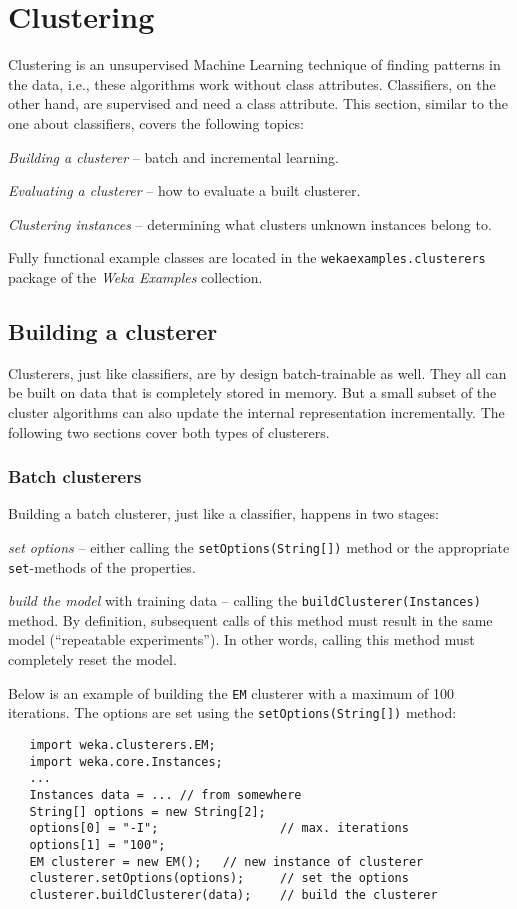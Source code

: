 \section{Clustering}
\label{api_clustering}
Clustering is an unsupervised Machine Learning technique of finding patterns in
the data, i.e., these algorithms work without class attributes. Classifiers, on
the other hand, are supervised and need a class attribute. This section,
similar to the one about classifiers, covers the following topics:
\begin{tight_itemize}
	\item \textit{Building a clusterer} -- batch and incremental learning.
	\item \textit{Evaluating a clusterer} -- how to evaluate a built clusterer.
	\item \textit{Clustering instances} -- determining what clusters unknown
instances belong to.
\end{tight_itemize}
Fully functional example classes are located in the
\texttt{wekaexamples.clusterers} package of the \textit{Weka Examples}
collection\cite{wekaexamples}.

\subsection{Building a clusterer}
Clusterers, just like classifiers, are by design batch-trainable as well. They
all can be built on data that is completely stored in memory. But a small subset
of the cluster algorithms can also update the internal representation
incrementally. The following two sections cover both types of clusterers.

\subsubsection*{Batch clusterers}
Building a batch clusterer, just like a classifier, happens in two stages:
\begin{tight_itemize}
	\item \textit{set options} -- either calling the
\texttt{setOptions(String[])} method or the appropriate \texttt{set}-methods of
the properties.
	\item \textit{build the model} with training data -- calling the
\texttt{buildClusterer(Instances)} method. By definition, subsequent calls of
this method must result in the same model (``repeatable experiments''). In other
words, calling this method must completely reset the model.
\end{tight_itemize}
Below is an example of building the \texttt{EM} clusterer with a maximum of 100
iterations. The options are set using the \texttt{setOptions(String[])} method:
\begin{verbatim}
   import weka.clusterers.EM;
   import weka.core.Instances;
   ...
   Instances data = ... // from somewhere
   String[] options = new String[2];
   options[0] = "-I";                 // max. iterations
   options[1] = "100";
   EM clusterer = new EM();   // new instance of clusterer
   clusterer.setOptions(options);     // set the options
   clusterer.buildClusterer(data);    // build the clusterer
\end{verbatim}

